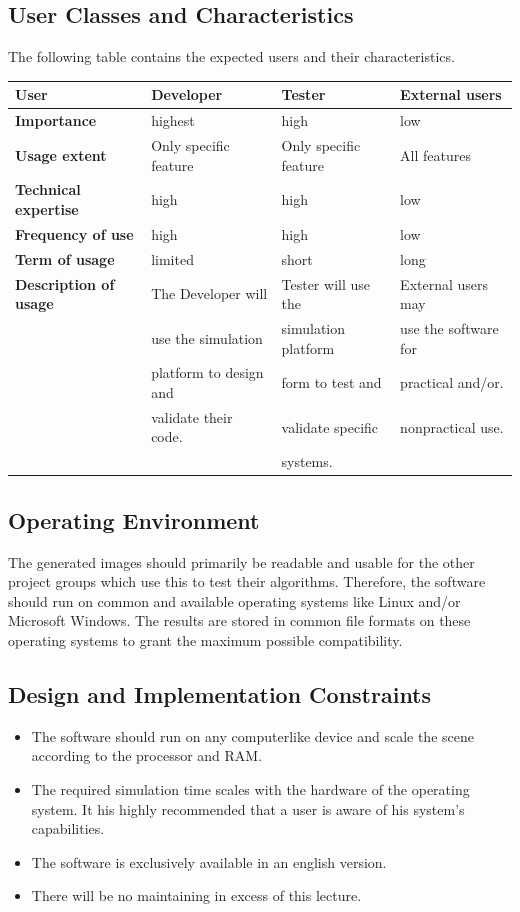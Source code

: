\documentclass[a4paper,12pt]{article}
\begin{document}
\subsection{User Classes and Characteristics}
The following table contains the expected users and their characteristics.\\
\begin{tabular}{|l|l|l|l|}
\hline
\textbf{User} & Developer & Tester & External users \\
\hline
\textbf{Importance} & highest & high & low \\
\hline
\textbf{Usage extent} & Only specific feature & Only specific feature & All features \\
\hline
\textbf{Technical expertise} & high & high & low\\
\hline
\textbf{Frequency of use} & high & high & low \\
\hline
\textbf{Term of usage} & limited & short & long\\
\hline
\textbf{Description of usage} & The Developer will & Tester will use the & External users may\\
& use the simulation & simulation platform & use the software for \\ 
&  platform to design and  & form to test and & practical and/or.\\
&  validate their code. & validate specific & nonpractical use. \\
& & systems. & \\
\hline
\end{tabular}
\subsection{Operating Environment}
The generated images should primarily be readable and usable for the other project groups which use this to test their algorithms. Therefore, the software should run on common and available operating systems like Linux and/or Microsoft Windows. The results are stored in common file formats on these operating systems to grant the maximum possible compatibility.
\subsection{Design and Implementation Constraints}
\begin{itemize}
\item The software should run on any computerlike device and scale the scene according to the processor and RAM.
\item The required simulation time scales with the hardware of the operating system. It his highly recommended that a user is aware of his system's capabilities.
\item The software is exclusively available in an english version.
\item There will be no maintaining in excess of this lecture.

\end{itemize}
\end{document}
